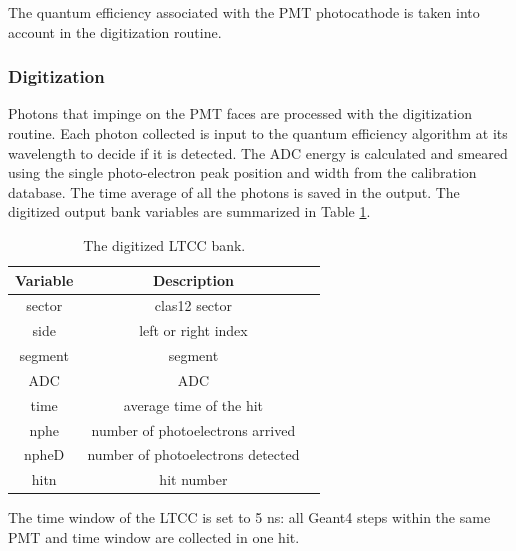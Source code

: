 The quantum efficiency associated with the PMT photocathode is taken into account in
the digitization routine.

\subsubsection{Digitization}

Photons that impinge on the PMT faces are processed with the digitization routine.
Each photon collected is input to the quantum efficiency algorithm at its wavelength to decide if it is detected.
The ADC energy is calculated and smeared using the single photo-electron peak position and width from the calibration database.
The time average of all the photons is saved in the output.
The digitized output bank variables are summarized in Table \ref{tab:ltccBank}.

\begin{table}[h]
	\begin{center}
		\begin{tabular}{| c | c | c |}
			\hline \hline
			Variable & Description                                         \\
			\hline
             sector  &                                     clas12 sector   \\
               side  &                               left or right index   \\
            segment  &                                           segment   \\
                ADC  &                                               ADC   \\
               time  &                           average time of the hit   \\
               nphe  &                  number of photoelectrons arrived   \\
              npheD  &                 number of photoelectrons detected   \\
               hitn  &                                        hit number   \\
			\hline \hline
		\end{tabular}
	\end{center}
	\caption{The digitized LTCC bank.}\label{tab:ltccBank}
\end{table}

The time window  of the LTCC is set to 5 ns: all Geant4 steps within the same PMT and time window are collected in one hit.
